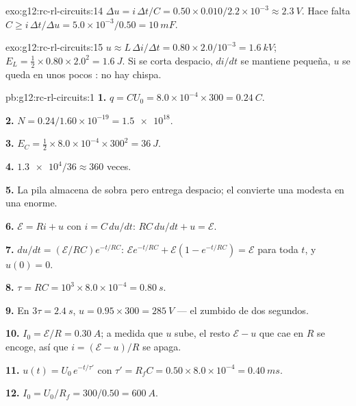 \begin{solution}{exo:g12:rc-rl-circuits:14}
$\Delta u = i\,\Delta t/C = 0.50 \times 0.010/2.2\times10^{-3} \approx
\qty{2.3}{V}$. Hace falta
$C \geq i\,\Delta t/\Delta u = 5.0\times10^{-3}/0.50 = \qty{10}{mF}$.
\end{solution}

\begin{solution}{exo:g12:rc-rl-circuits:15}
$u \approx L\,\Delta i/\Delta t = 0.80 \times 2.0/10^{-3} =
\qty{1.6}{kV}$;
$E_L = \tfrac12 \times 0.80 \times 2.0^2 = \qty{1.6}{J}$. Si se corta
despacio, $di/dt$ se mantiene pequeña, $u$ se queda en unos pocos
: no hay chispa.
\end{solution}

\begin{solution}{pb:g12:rc-rl-circuits:1}
\textbf{1.} $q = CU_0 = 8.0\times10^{-4} \times 300 = \qty{0.24}{C}$.

\textbf{2.} $N = 0.24/1.60\times10^{-19} = \num{1.5e18}$.

\textbf{3.} $E_C = \tfrac12 \times 8.0\times10^{-4} \times 300^2 =
\qty{36}{J}$.

\textbf{4.} $\num{1.3e4}/36 \approx 360$ veces.

\textbf{5.} La pila almacena de sobra pero entrega despacio; el
 convierte una  modesta en una \emph{}
enorme.

\textbf{6.} $\mathcal{E} = Ri + u$ con $i = C\,du/dt$:
$RC\,du/dt + u = \mathcal{E}$.

\textbf{7.} $du/dt = (\mathcal{E}/RC)e^{-t/RC}$:
$\mathcal{E}e^{-t/RC} + \mathcal{E}(1 - e^{-t/RC}) = \mathcal{E}$ para
toda $t$, y $u(0) = 0$.

\textbf{8.} $\tau = RC = 10^3 \times 8.0\times10^{-4} = \qty{0.80}{s}$.

\textbf{9.} En $3\tau = \qty{2.4}{s}$, $u = 0.95 \times 300 =
\qty{285}{V}$ --- el zumbido de dos segundos.

\textbf{10.} $I_0 = \mathcal{E}/R = \qty{0.30}{A}$; a medida que $u$
sube, el resto $\mathcal{E} - u$ que cae en $R$ se encoge, así que
$i = (\mathcal{E}-u)/R$ se apaga.

\textbf{11.} $u(t) = U_0\,e^{-t/\tau'}$ con
$\tau' = R_f C = 0.50 \times 8.0\times10^{-4} = \qty{0.40}{ms}$.

\textbf{12.} $I_0 = U_0/R_f = 300/0.50 = \qty{600}{A}$.


\end{solution}
